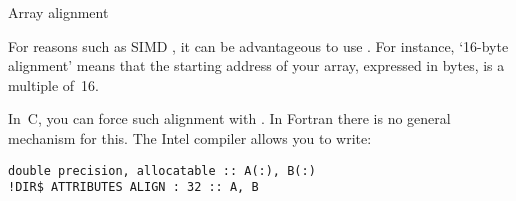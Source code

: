 
 {Array alignment}

For reasons such as \ac{SIMD} , it can
be advantageous to use . For
instance, `16-byte alignment' means that the starting address of your
array, expressed in bytes, is a multiple of~16.

In~C, you can force such alignment with 
. In Fortran there is no general
mechanism for this. The Intel compiler allows you to write:
\begin{verbatim}
double precision, allocatable :: A(:), B(:)
!DIR$ ATTRIBUTES ALIGN : 32 :: A, B
\end{verbatim}


